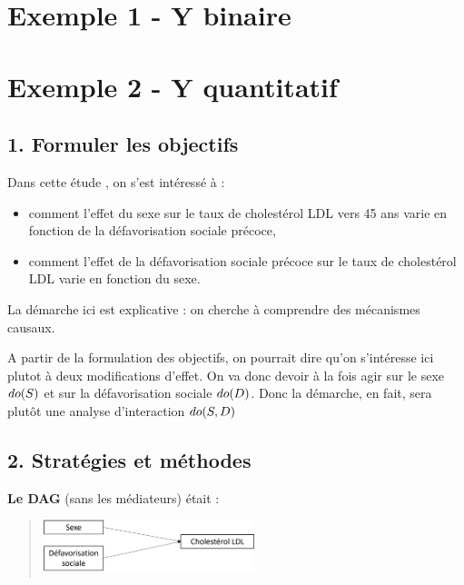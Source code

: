 \documentclass[
]{book}
\providecommand{\tightlist}{%
  \setlength{\itemsep}{0pt}\setlength{\parskip}{0pt}}
\begin{document}
\hypertarget{exemple-1---y-binaire}{%
\chapter{Exemple 1 - Y binaire}\label{exemple-1---y-binaire}}

\hypertarget{exemple-2---y-quantitatif}{%
\chapter{Exemple 2 - Y quantitatif}\label{exemple-2---y-quantitatif}}

\hypertarget{formuler-les-objectifs}{%
\section{1. Formuler les objectifs}\label{formuler-les-objectifs}}

Dans cette étude \citet{colineaux2023explaining}, on s'est intéressé à :

\begin{itemize}
\tightlist
\item
  comment l'effet du sexe sur le taux de cholestérol LDL vers 45 ans varie en fonction de la défavorisation sociale précoce,
\item
  comment l'effet de la défavorisation sociale précoce sur le taux de cholestérol LDL varie en fonction du sexe.
\end{itemize}

La démarche ici est explicative : on cherche à comprendre des mécanismes causaux.

A partir de la formulation des objectifs, on pourrait dire qu'on s'intéresse ici plutot à deux modifications d'effet.
On va donc devoir à la fois agir sur le sexe \(\small do(S)\) et sur la défavorisation sociale \(\small do(D)\).
Donc la démarche, en fait, sera plutôt une analyse d'interaction \(\small do(S,D)\)

\hypertarget{stratuxe9gies-et-muxe9thodes}{%
\section{2. Stratégies et méthodes}\label{stratuxe9gies-et-muxe9thodes}}

\textbf{Le DAG} (sans les médiateurs) était :

\begin{quote}
\includegraphics[width=0.5\textwidth,height=\textheight]{img/Image13.png}
\end{quote}
\end{document}
